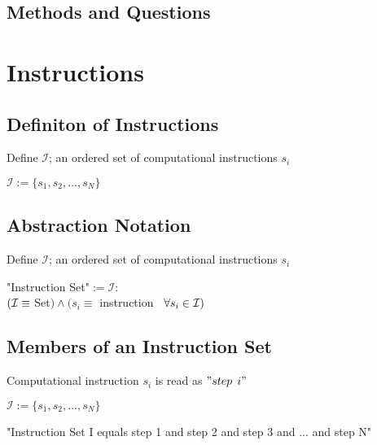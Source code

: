 \documentclass[11pt]{article}
\begin{document}
\begin{center}
\section*{Methods and Questions}
\end{center}






\newpage

\section{Instructions}
\subsection{Definiton of Instructions}
Define $\mathcal{I}$; an ordered set of computational instructions $s_i$
\begin{center}
$
\mathcal{I} := \{ s_1,s_2,...,s_{N}\}
$
\end{center}



\subsection{Abstraction Notation}
Define $\mathcal{I}$; an ordered set of computational instructions $s_i$
\begin{center}
"Instruction Set"$ := \mathcal{I}:
$
\\ \vspace{2mm}
$
(\mathcal{I} \equiv \hspace{1mm} $Set$) \land (s_i \equiv$ instruction$ \hspace{3mm} \forall s_i \in \mathcal{I})
$
\end{center}




\subsection{Members of an Instruction Set}
Computational instruction $s_i$ is read as $"step$ $i"$
\begin{center}
$
\mathcal{I} := \{ s_1,s_2,...,s_{N}\}
$
\end{center}
\vspace{1mm}
"Instruction Set I equals step 1 and step 2 and step 3 and ... and step N"
\end{document}

